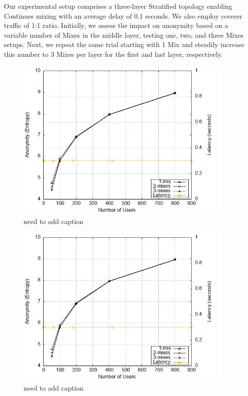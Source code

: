 \documentclass[logo,msc,cyber]{infthesis}   %
\begin{document}
Our experimental setup comprises a three-layer Stratified topology enabling
Continues mixing with an average delay of 0.1 seconds. We also employ coverer
traffic of 1:1 ratio. Initially, we assess the impact on anonymity based on a
variable number of Mixes in the middle layer, testing one, two, and three
Mixes setups. Next, we repeat the same trial starting with 1 Mix and steadily
increase this number to 3 Mixes per layer for the first and last layer,
respectively.

\begin{figure}[h!]
    \centering
    \includegraphics[height=8cm]{figures/simulator_extentions/first_layer_variable.png}
    \caption{need to add caption}
    \label{fig:first-layer-variable}
\end{figure} 

\begin{figure}[h!]
    \centering
    \includegraphics[height=8cm]{figures/simulator_extentions/last_layer_variable.png}
    \caption{need to add caption}
    \label{fig:last-layer-variable}
\end{figure} 
\end{document}

